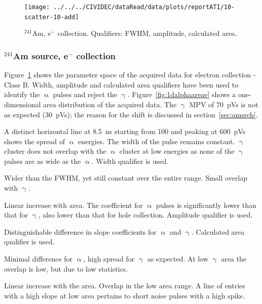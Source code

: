\clearpage
\begin{figure}[!t]
\centering
\texttt{[image: ../../../CIVIDEC/dataRead/data/plots/reportATI/10-scatter-10-add]}
\caption{$^{241}$Am, e$^{-}$ collection. Qualifiers: FWHM, amplitude, calculated area.}
\label{fig:scatterae}
\end{figure}


\clearpage
\subsubsection{$^{241}$Am source, e$^-$ collection}
Figure~\ref{fig:scatterae} shows the parameter space of the acquired data for electron collection - Class B. Width, amplitude and calculated area qualifiers have been used to identify the $\upalpha$ pulses and reject the $\upgamma$. Figure~\ref{fig:1dalphaareae} shows a one-dimensional area distribution of the acquired data. The $\upgamma$ MPV of 70~pVs is not as expected (30~pVs); the reason for the shift is discussed in section~\ref{sec:amsrch}.
\begin{description}
\setlength\itemsep{-0.3em}
\item[Width: ] A distinct horizontal line at 8.5~ns starting from 100 and peaking at 600~pVs shows the spread of $\upalpha$ energies. The width of the pulse remains constant. $\upgamma$ cluster does not overlap with the $\upalpha$ cluster at low energies as none of the $\upgamma$ pulses are as wide as the $\upalpha$. Width qualifier is used.
\item[Base width: ] Wider than the FWHM, yet still constant over the entire range. Small overlap with $\upgamma$.
\item[Amplitude: ] Linear increase with area. The coefficient for $\upalpha$ pulses is significantly lower than that for $\upgamma$, also lower than that for hole collection. Amplitude qualifier is used.
\item[Calculated area: ] Distinguishable difference in slope coefficients for $\upalpha$ and $\upgamma$. Calculated area qualifier is used.
\item[Base width -- width: ] Minimal difference for $\upalpha$, high spread for $\upgamma$ as expected. At low $\upgamma$ area the overlap is low, but due to low statistics.
\item[Slope: ] Linear increase with the area. Overlap in the low area range. A line of entries with a high slope at low area pertains to short noise pulses with a high spike.
\end{description}

